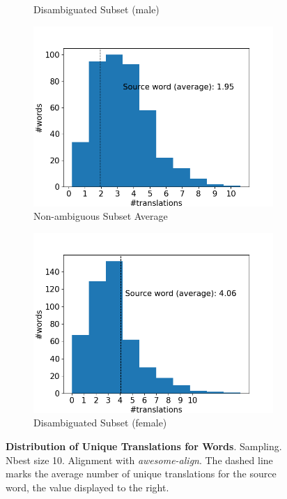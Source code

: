 \begin{figure}[!htb]
\begin{subfigure}{0.49\textwidth}
         \caption{Disambiguated Subset (male)}
     \end{subfigure}
     \begin{subfigure}{0.49\textwidth}
         \centering
         \includegraphics[width=\textwidth]{figures/alignment/align_sampling/word_translations_average.png}
         \caption{Non-ambiguous Subset Average}
     \end{subfigure}
     \hfill
     \begin{subfigure}{0.49\textwidth}
         \centering
         \includegraphics[width=\textwidth]{figures/alignment/align_sampling/word_translations_female.png}
         \caption{Disambiguated Subset (female)}
     \end{subfigure}
        \caption[Distribution of Unique Translations for Words: Sampling]{\textbf{Distribution of Unique Translations for Words}. Sampling. Nbest size 10. Alignment with \textit{awesome-align}. The dashed line marks the average number of unique translations for the source word, the value displayed to the right.}
        \label{fig:alignment_graphs_translation_sampling}

\end{figure}

